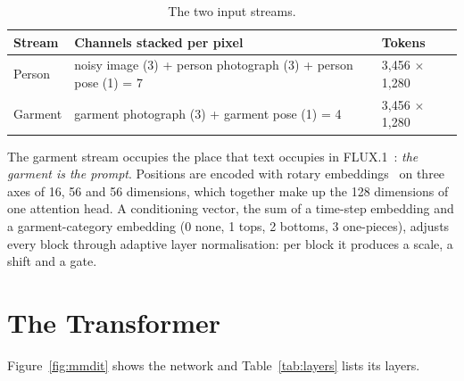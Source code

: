 \begin{table}[!htbp]
\centering
\caption{The two input streams.}
\label{tab:streams}
\small
\begin{tabularx}{\linewidth}{@{}L{25mm}YL{30mm}@{}}
\toprule
\textbf{Stream} & \textbf{Channels stacked per pixel} & \textbf{Tokens}\\
\midrule
Person & noisy image (3) + person photograph (3) + person pose (1) = 7 & 3{,}456 $\times$ 1{,}280\\
Garment & garment photograph (3) + garment pose (1) = 4 & 3{,}456 $\times$ 1{,}280\\
\bottomrule
\end{tabularx}
\end{table}

\noindent The garment stream occupies the place that text occupies in FLUX.1~\cite{flux}: \emph{the garment is the prompt}. Positions are encoded with rotary embeddings~\cite{rope} on three axes of 16, 56 and 56 dimensions, which together make up the 128 dimensions of one attention head. A conditioning vector, the sum of a time-step embedding and a garment-category embedding (0 none, 1 tops, 2 bottoms, 3 one-pieces), adjusts every block through adaptive layer normalisation: per block it produces a scale, a shift and a gate.

\section{The Transformer}

Figure~\ref{fig:mmdit} shows the network and Table~\ref{tab:layers} lists its layers.

